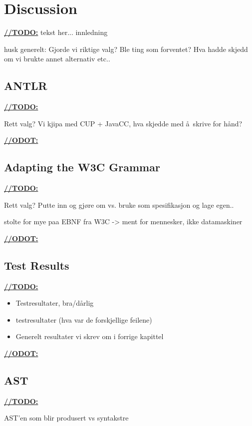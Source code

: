 \chapter{Discussion}
\underline{\textbf{\LARGE //TODO:}} tekst her... innledning


husk generelt: Gjorde vi riktige valg? Ble ting som forventet? Hva hadde skjedd om vi brukte annet alternativ etc..






\section{ANTLR}
\underline{\textbf{\LARGE //TODO:}}

Rett valg?
Vi kjipa med CUP + JavaCC, hva skjedde med \aa~skrive for h\aa nd?

\underline{\textbf{\LARGE //ODOT:}}

\section{Adapting the W3C Grammar}
\underline{\textbf{\LARGE //TODO:}}

Rett valg? Putte inn og gj\o re om vs. bruke som spesifikasjon og lage egen..

stolte for mye paa EBNF fra W3C -> ment for mennesker, ikke datamaskiner

\underline{\textbf{\LARGE //ODOT:}}


\section{Test Results}

\underline{\textbf{\LARGE //TODO:}}
\begin{itemize}
\item Testresultater, bra/d\aa rlig
\item testresultater (hva var de forskjellige feilene)
\item Generelt resultater vi skrev om i forrige kapittel
\end{itemize}

\underline{\textbf{\LARGE //ODOT:}}

\section{AST}
\underline{\textbf{\LARGE //TODO:}}

AST'en som blir produsert vs syntakstre

